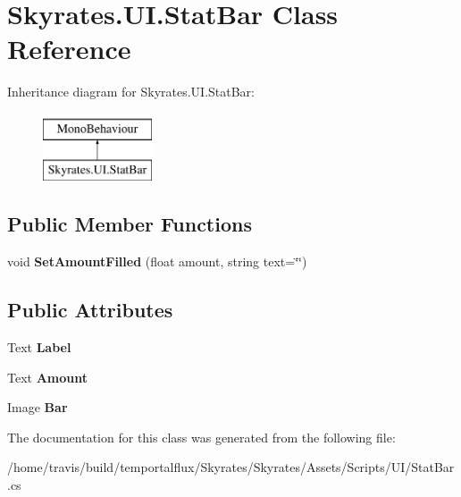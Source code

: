 \hypertarget{class_skyrates_1_1_u_i_1_1_stat_bar}{\section{Skyrates.\-U\-I.\-Stat\-Bar Class Reference}
\label{class_skyrates_1_1_u_i_1_1_stat_bar}
}
Inheritance diagram for Skyrates.\-U\-I.\-Stat\-Bar\-:\begin{figure}[H]
\begin{center}
\leavevmode
\includegraphics[height=2.000000cm]{class_skyrates_1_1_u_i_1_1_stat_bar}
\end{center}
\end{figure}
\subsection*{Public Member Functions}
\begin{DoxyCompactItemize}
\item 
\hypertarget{class_skyrates_1_1_u_i_1_1_stat_bar_a1257b69ad30895704de0b8d3614435db}{void {\bfseries Set\-Amount\-Filled} (float amount, string text=\char`\"{}\char`\"{})}\label{class_skyrates_1_1_u_i_1_1_stat_bar_a1257b69ad30895704de0b8d3614435db}

\end{DoxyCompactItemize}
\subsection*{Public Attributes}
\begin{DoxyCompactItemize}
\item 
\hypertarget{class_skyrates_1_1_u_i_1_1_stat_bar_a553c111d4744016cace429eadbd024c7}{Text {\bfseries Label}}\label{class_skyrates_1_1_u_i_1_1_stat_bar_a553c111d4744016cace429eadbd024c7}

\item 
\hypertarget{class_skyrates_1_1_u_i_1_1_stat_bar_a981da77bbe8350833ea31473e2e8f4f1}{Text {\bfseries Amount}}\label{class_skyrates_1_1_u_i_1_1_stat_bar_a981da77bbe8350833ea31473e2e8f4f1}

\item 
\hypertarget{class_skyrates_1_1_u_i_1_1_stat_bar_ae399f3bdc3b7c07a1a58c5b152f659b9}{Image {\bfseries Bar}}\label{class_skyrates_1_1_u_i_1_1_stat_bar_ae399f3bdc3b7c07a1a58c5b152f659b9}

\end{DoxyCompactItemize}


The documentation for this class was generated from the following file\-:\begin{DoxyCompactItemize}
\item 
/home/travis/build/temportalflux/\-Skyrates/\-Skyrates/\-Assets/\-Scripts/\-U\-I/Stat\-Bar.\-cs\end{DoxyCompactItemize}
